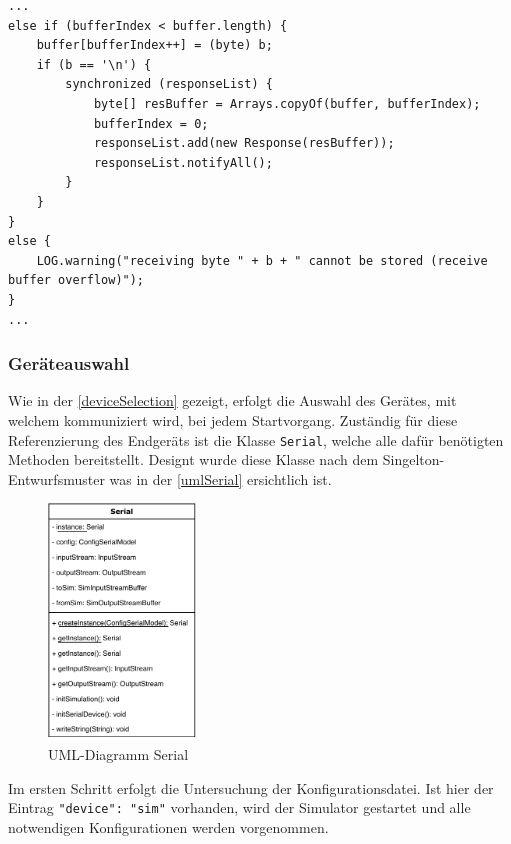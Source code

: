 \begin{lstlisting}[style=java,caption=Teilabschnitt CommunicationReceiveThread,label=commThreadSend]
...
else if (bufferIndex < buffer.length) {
    buffer[bufferIndex++] = (byte) b;
    if (b == '\n') {
        synchronized (responseList) {
            byte[] resBuffer = Arrays.copyOf(buffer, bufferIndex);
            bufferIndex = 0;
            responseList.add(new Response(resBuffer));
            responseList.notifyAll();
        }
    }
}
else {
    LOG.warning("receiving byte " + b + " cannot be stored (receive buffer overflow)");
}
...
\end{lstlisting}
\subsubsection{Geräteauswahl} \label{sssec:deviceSelection}
Wie in der \autoref{deviceSelection} gezeigt, erfolgt die Auswahl des Gerätes, mit welchem kommuniziert wird, bei jedem Startvorgang.
Zuständig für diese Referenzierung des Endgeräts ist die Klasse \lstinline[style=java]{Serial}, welche alle dafür benötigten Methoden bereitstellt.
Designt wurde diese Klasse nach dem Singelton-Entwurfsmuster was in der \autoref{umlSerial} ersichtlich ist.
\begin{figure}[H]
\centering
\includegraphics[width=0.35\textwidth]{fig/ainf/SerialUML.pdf}
\caption{UML-Diagramm Serial}
\label{umlSerial}
\end{figure}
Im ersten Schritt erfolgt die Untersuchung der Konfigurationsdatei.
Ist hier der Eintrag \lstinline[style=json]{"device": "sim"} vorhanden, wird der Simulator gestartet und alle notwendigen Konfigurationen werden vorgenommen.
